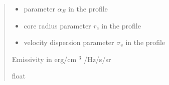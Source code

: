 \documentclass[letterpaper,10pt,english]{sphinxmanual}
\begin{document}
\begin{fulllineitems}
\begin{quote}
\begin{description}
\begin{itemize}
\item {} 
\sphinxAtStartPar
{} \textendash{} parameter \(\alpha_E\) in the {\hyperref[\detokenize{diffsph.profiles:diffsph.profiles.templates.enst}]{}} profile

\item {} 
\sphinxAtStartPar
{} \textendash{} core radius parameter \(r_c\) in the {\hyperref[\detokenize{diffsph.profiles:diffsph.profiles.templates.cnfw}]{}} profile

\item {} 
\sphinxAtStartPar
{} \textendash{} velocity dispersion parameter \(\sigma_v\) in the {\hyperref[\detokenize{diffsph.profiles:diffsph.profiles.templates.sis}]{}} profile

\end{itemize}

\sphinxAtStartPar
Emissivity in erg/cm \({}^3\) /Hz/s/sr

\sphinxAtStartPar
float

\end{description}\end{quote}

\end{fulllineitems}

\end{document}
